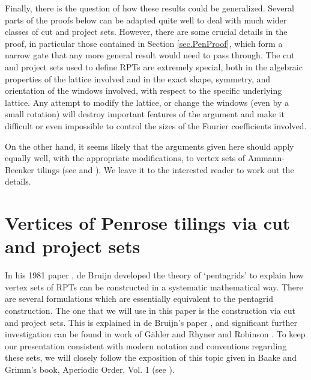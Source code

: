 \documentclass[reqno]{amsart}
\newtheorem{theorem}{Theorem}
\begin{document}
Finally, there is the question of how these results could be generalized. Several parts of the proofs below can be adapted quite well to deal with much wider classes of cut and project sets. However, there are some crucial details in the proof, in particular those contained in Section \ref{sec.PenProof}, which form a narrow gate that any more general result would need to pass through. The cut and project sets used to define RPTs are extremely special, both in the algebraic properties of the lattice involved and in the exact shape, symmetry, and orientation of the windows involved, with respect to the specific underlying lattice. Any attempt to modify the lattice, or change the windows (even by a small rotation) will destroy important features of the argument and make it difficult or even impossible to control the sizes of the Fourier coefficients involved.

On the other hand, it seems likely that the arguments given here should apply equally well, with the appropriate modifications, to vertex sets of Ammann-Beenker tilings (see \cite[Section 10.4]{GrunShep1987} and \cite{Been1982}). We leave it to the interested reader to work out the details.

%


\section{Vertices of Penrose tilings via cut and project sets}\label{sec.ModelSets}
In his 1981 paper \cite{deBr1981}, de Bruijn developed the theory of `pentagrids' to explain how vertex sets of RPTs can be constructed in a systematic mathematical way. There are several formulations which are essentially equivalent to the pentagrid construction. The one that we will use in this paper is the construction via cut and project sets. This is explained in de Bruijn's paper \cite[Section 7]{deBr1981}, and significant further investigation can be found in work of G\"ahler and Rhyner \cite{GahlRhyn1986} and Robinson \cite{Robi1996}. To keep our presentation consistent with modern notation and conventions regarding these sets, we will closely follow the exposition of this topic given in Baake and Grimm's book, Aperiodic Order, Vol. 1 (see \cite[Example 7.11]{BaakGrim2013}).
\end{document}
